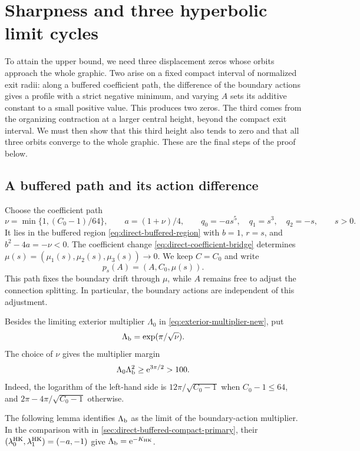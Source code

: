 \section{Sharpness and three hyperbolic limit cycles}
\label{sec:sharpness}

To attain the upper bound, we need three displacement zeros whose
orbits approach the whole graphic. Two arise on a fixed compact
interval of normalized exit radii: along a buffered coefficient path,
the difference of the boundary actions gives a profile with a strict
negative minimum, and varying \(A\) sets its additive constant to a
small positive value. This produces two zeros. The third comes from
the organizing contraction at a larger central height, beyond the
compact exit interval. We must then show that this third height also
tends to zero and that all three orbits converge to the whole graphic.
These are the final steps of the proof below.

\subsection{A buffered path and its action difference}

Choose the coefficient path
\begin{equation}
\label{eq:sharpness-coefficient-path}
 \nu=\min\{1,(C_0-1)/64\},\qquad a=(1+\nu)/4,\qquad
 q_0=-as^5,\quad q_1=s^3,\quad q_2=-s,\qquad s>0.
\end{equation}
It lies in the buffered region \eqref{eq:direct-buffered-region}
with \(b=1\), \(r=s\), and \(b^2-4a=-\nu<0\).
The coefficient change \eqref{eq:direct-coefficient-bridge}
determines \(\mu(s)=(\mu_1(s),\mu_2(s),\mu_3(s))\to0\).
We keep \(C=C_0\) and write
\[
 p_s(A)=(A,C_0,\mu(s)).
\]
This path fixes the boundary drift through \(\mu\), while \(A\)
remains free to adjust the connection splitting. In particular, the
boundary actions are independent of this adjustment.

Besides the limiting exterior multiplier \(\Lambda_0\) in
\eqref{eq:exterior-multiplier-new}, put
\[
 \Lambda_{\rm b}=\exp(\pi/\sqrt\nu).
\]
The choice of \(\nu\) gives the multiplier margin
\begin{equation}
\label{eq:sharpness-multiplier-margin}
 \Lambda_0\Lambda_{\rm b}^2\ge \mathrm e^{3\pi/2}>100.
\end{equation}
Indeed, the logarithm of the left-hand side is
\(12\pi/\sqrt{C_0-1}\) when \(C_0-1\le64\), and
\(2\pi-4\pi/\sqrt{C_0-1}\) otherwise.

The following lemma identifies \(\Lambda_{\rm b}\) as the limit of the
boundary-action multiplier. In the comparison with
\cite[(2.13) and (6.8)]{HK2026} in
\cref{sec:direct-buffered-compact-primary}, their
\((\lambda_0^{\rm HK},\lambda_1^{\rm HK})=(-a,-1)\) give
\(\Lambda_{\rm b}=\mathrm e^{-K_{\rm HK}}\).

